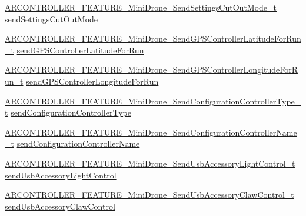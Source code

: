 \begin{DoxyCompactItemize}
\item 
\hyperlink{_a_r_c_o_n_t_r_o_l_l_e_r___feature_8h_a2186b2bdfb45baec35d62c723e8eb532}{A\+R\+C\+O\+N\+T\+R\+O\+L\+L\+E\+R\+\_\+\+F\+E\+A\+T\+U\+R\+E\+\_\+\+Mini\+Drone\+\_\+\+Send\+Settings\+Cut\+Out\+Mode\+\_\+t} \hyperlink{struct_a_r_c_o_n_t_r_o_l_l_e_r___f_e_a_t_u_r_e___mini_drone__t_a99a2229b19537ecaf7be24d9066aa566}{send\+Settings\+Cut\+Out\+Mode}
\item 
\hyperlink{_a_r_c_o_n_t_r_o_l_l_e_r___feature_8h_af65f1281309b440d71e2e00f00fe5094}{A\+R\+C\+O\+N\+T\+R\+O\+L\+L\+E\+R\+\_\+\+F\+E\+A\+T\+U\+R\+E\+\_\+\+Mini\+Drone\+\_\+\+Send\+G\+P\+S\+Controller\+Latitude\+For\+Run\+\_\+t} \hyperlink{struct_a_r_c_o_n_t_r_o_l_l_e_r___f_e_a_t_u_r_e___mini_drone__t_a339d6cdb90a4edd3d54f837c13f86451}{send\+G\+P\+S\+Controller\+Latitude\+For\+Run}
\item 
\hyperlink{_a_r_c_o_n_t_r_o_l_l_e_r___feature_8h_ab4a7e5b03f373bb6023e407b8d90e3b9}{A\+R\+C\+O\+N\+T\+R\+O\+L\+L\+E\+R\+\_\+\+F\+E\+A\+T\+U\+R\+E\+\_\+\+Mini\+Drone\+\_\+\+Send\+G\+P\+S\+Controller\+Longitude\+For\+Run\+\_\+t} \hyperlink{struct_a_r_c_o_n_t_r_o_l_l_e_r___f_e_a_t_u_r_e___mini_drone__t_ad93725b60d04e2f5d684a8be6e628721}{send\+G\+P\+S\+Controller\+Longitude\+For\+Run}
\item 
\hyperlink{_a_r_c_o_n_t_r_o_l_l_e_r___feature_8h_aee0fb7b93ff8e0e36c71725f5cf1f2ba}{A\+R\+C\+O\+N\+T\+R\+O\+L\+L\+E\+R\+\_\+\+F\+E\+A\+T\+U\+R\+E\+\_\+\+Mini\+Drone\+\_\+\+Send\+Configuration\+Controller\+Type\+\_\+t} \hyperlink{struct_a_r_c_o_n_t_r_o_l_l_e_r___f_e_a_t_u_r_e___mini_drone__t_a44292c80f78ade8bedf9c1f61d1145ab}{send\+Configuration\+Controller\+Type}
\item 
\hyperlink{_a_r_c_o_n_t_r_o_l_l_e_r___feature_8h_a1acd485a1516f26da00d412a2aaa15f4}{A\+R\+C\+O\+N\+T\+R\+O\+L\+L\+E\+R\+\_\+\+F\+E\+A\+T\+U\+R\+E\+\_\+\+Mini\+Drone\+\_\+\+Send\+Configuration\+Controller\+Name\+\_\+t} \hyperlink{struct_a_r_c_o_n_t_r_o_l_l_e_r___f_e_a_t_u_r_e___mini_drone__t_a525700de568a60253b2e6cce2dbb5890}{send\+Configuration\+Controller\+Name}
\item 
\hyperlink{_a_r_c_o_n_t_r_o_l_l_e_r___feature_8h_a2a572fb985d57bb0ad1573509f846dd4}{A\+R\+C\+O\+N\+T\+R\+O\+L\+L\+E\+R\+\_\+\+F\+E\+A\+T\+U\+R\+E\+\_\+\+Mini\+Drone\+\_\+\+Send\+Usb\+Accessory\+Light\+Control\+\_\+t} \hyperlink{struct_a_r_c_o_n_t_r_o_l_l_e_r___f_e_a_t_u_r_e___mini_drone__t_a4e002585ea7acceeb0e2cc8eaf449898}{send\+Usb\+Accessory\+Light\+Control}
\item 
\hyperlink{_a_r_c_o_n_t_r_o_l_l_e_r___feature_8h_aedf5284cc4d72b7fb5655eb0d2f2fefd}{A\+R\+C\+O\+N\+T\+R\+O\+L\+L\+E\+R\+\_\+\+F\+E\+A\+T\+U\+R\+E\+\_\+\+Mini\+Drone\+\_\+\+Send\+Usb\+Accessory\+Claw\+Control\+\_\+t} \hyperlink{struct_a_r_c_o_n_t_r_o_l_l_e_r___f_e_a_t_u_r_e___mini_drone__t_ad02f5c28ebee9c2927e3943077bc8ebd}{send\+Usb\+Accessory\+Claw\+Control}

\end{DoxyCompactItemize}
